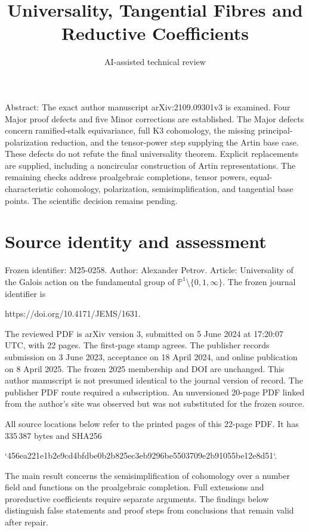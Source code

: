 \documentclass[10pt]{article}
\title{Universality, Tangential Fibres
and Reductive Coefficients}
\author{AI-assisted technical review}
\date{}
\begin{document}
\maketitle
Abstract: The exact author manuscript arXiv:2109.09301v3 is examined. Four Major proof defects and five Minor corrections are established. The Major defects concern ramified-stalk equivariance, full K3 cohomology, the missing principal-polarization reduction, and the tensor-power step supplying the Artin base case. These defects do not refute the final universality theorem. Explicit replacements are supplied, including a noncircular construction of Artin representations. The remaining checks address proalgebraic completions, tensor powers, equal-characteristic cohomology, polarization, semisimplification, and tangential base points. The scientific decision remains pending.\par
\section*{Source identity and assessment}
Frozen identifier: M25-0258. Author: Alexander Petrov. Article: Universality of the Galois action on the fundamental group of \(\mathbb P^1\setminus\{0,1,\infty\}\). The frozen journal identifier is\par
https://doi.org/10.4171/JEMS/1631.\par
The reviewed PDF is arXiv version 3, submitted on 5 June 2024 at 17:20:07 UTC, with 22 pages. The first-page stamp agrees. The publisher records submission on 3 June 2023, acceptance on 18 April 2024, and online publication on 8 April 2025. The frozen 2025 membership and DOI are unchanged. This author manuscript is not presumed identical to the journal version of record. The publisher PDF route required a subscription. An unversioned 20-page PDF linked from the author’s site was observed but was not substituted for the frozen source.\par
All source locations below refer to the printed pages of this 22-page PDF. It has 335 387 bytes and SHA256\par
`456ea221e1b2e9cd4bfdbe0b2b825ec3eb9296be5503709e2b91055be12e8d51`.\par
The main result concerns the semisimplification of cohomology over a number field and functions on the proalgebraic completion. Full extensions and proreductive coefficients require separate arguments. The findings below distinguish false statements and proof steps from conclusions that remain valid after repair.\par
\end{document}
